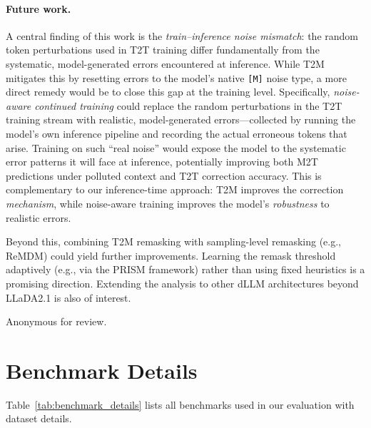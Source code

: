 \documentclass{article}
\newcommand{\mask}{\texttt{[M]}}
\newcommand{\MtoT}{\textrm{M2T}}
\newcommand{\TtoT}{\textrm{T2T}}
\newcommand{\TtoM}{\textrm{T2M}}
\begin{document}
\paragraph{Future work.} A central finding of this work is the \emph{train--inference noise mismatch}: the random token perturbations used in \TtoT{} training differ fundamentally from the systematic, model-generated errors encountered at inference. While \TtoM{} mitigates this by resetting errors to the model's native \mask{} noise type, a more direct remedy would be to close this gap at the training level. Specifically, \emph{noise-aware continued training} could replace the random perturbations in the \TtoT{} training stream with realistic, model-generated errors---collected by running the model's own inference pipeline and recording the actual erroneous tokens that arise. Training on such ``real noise'' would expose the model to the systematic error patterns it will face at inference, potentially improving both \MtoT{} predictions under polluted context and \TtoT{} correction accuracy. This is complementary to our inference-time approach: \TtoM{} improves the correction \emph{mechanism}, while noise-aware training improves the model's \emph{robustness} to realistic errors.

Beyond this, combining \TtoM{} remasking with sampling-level remasking (e.g., ReMDM) could yield further improvements. Learning the remask threshold adaptively (e.g., via the PRISM framework) rather than using fixed heuristics is a promising direction. Extending the analysis to other dLLM architectures beyond LLaDA2.1 is also of interest.

\begin{ack}
Anonymous for review.
\end{ack}




\newpage
\appendix
\section{Benchmark Details}
\label{app:benchmarks}

Table~\ref{tab:benchmark_details} lists all benchmarks used in our evaluation with dataset details.
\end{document}
